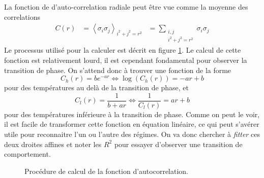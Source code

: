 \documentclass[a4paper, openany, 11pt]{article}
\begin{document}
La fonction de d'auto-correlation radiale peut être vue comme la moyenne des correlations 
\begin{equation}
    \begin{aligned}
        C(r) &= \left< \sigma_i \sigma_j\right>_{i^2+j^2=r^2} 
        &= \sum_{\substack{i, j \\ i^2+j^2=r^2}} \sigma_i \sigma_j
    \end{aligned}
\end{equation}
Le processus utilisé pour la calculer est décrit en figure \ref{fig:corr}. Le calcul de cette
fonction est relativement lourd, il est cependant fondamental pour observer la transition de phase.
On s'attend donc à trouver une fonction de la forme 
\begin{equation}
    C_h(r) = b e^{-ar} \iff \log(C_h(r)) = -a r + b
\end{equation}
pour des températures au delà de la transition de phase, et 
\begin{equation}
    C_l(r) = \frac{1}{b+ar} \iff \frac{1}{C_l(r)}  = a r + b  
\end{equation}
pour des températures inférieure à la transition de phase. Comme on peut le
voir, il est facile de transformer cette fonction en équation linéaire, ce qui
peut s'avérer utile pour reconnaitre l'un ou l'autre des régimes. On va donc chercher à
\emph{fitter} ces deux droites affines et noter les $R^2$ pour essayer d'observer une transition de
comportement.


\begin{figure}
    \caption{Procédure de calcul de la fonction d'autocorrelation.}
    \label{fig:corr}
\end{figure}



\end{document}
